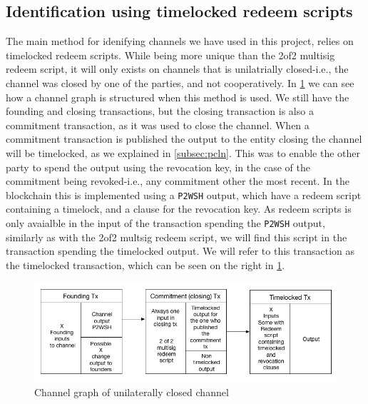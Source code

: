 \subsection{Identification using timelocked redeem scripts}
\label{timelocked_identification}

The main method for idenifying channels we have used in this project, relies on timelocked redeem scripts.
While being more unique than the 2of2 multisig redeem script, it will only exists on channels that is unilatrially closed-i.e., the channel was closed by one of the parties, and not cooperatively.
In \cref{fig:ln_tx_graph} we can see how a channel graph is structured when this method is used.
We still have the founding and closing transactions, but the closing transaction is also a commitment transaction, as it was used to close the channel.
When a commitment transaction is published the output to the entity closing the channel will be timelocked, as we explained in \cref{subsec:pcln}.
This was to enable the other party to spend the output using the revocation key, in the case of the commitment being revoked-i.e., any commitment other the most recent.
In the blockchain this is implemented using a {\tt P2WSH} output, which have a redeem script containing a timelock, and a clause for the revocation key.
As redeem scripts is only avaialble in the input of the transaction spending the {\tt P2WSH} output, similarly as with the 2of2 multsig redeem script,
we will find this script in the transaction spending the timelocked output. 
We will refer to this transaction as the timelocked transaction, which can be seen on the right in \cref{fig:ln_tx_graph}.

\begin{figure}[h]
    \centering
    \includegraphics[width=15cm]{figures/chan_graph.png}
    \caption{Channel graph of unilaterally closed channel}
    \label{fig:ln_tx_graph}
\end{figure}

